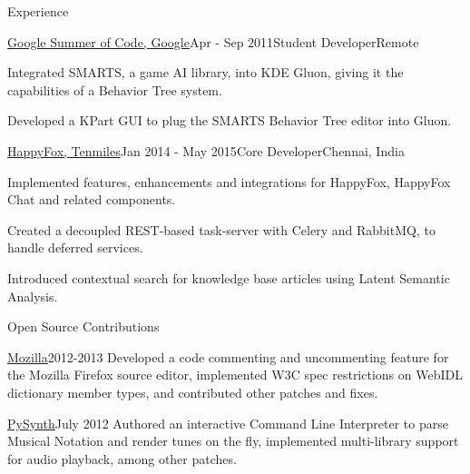 \documentclass{resume} %
\begin{document}
\begin{rSection}{Experience}
\vspace{2mm}

    \begin{rSubsection}{\href{https://www.google-melange.com/gsoc/project/details/google/gsoc2011/pranavrc/5757334940811264}{Google Summer of Code, Google}}{Apr - Sep 2011}{Student Developer}{Remote}
\item Integrated SMARTS, a game AI library, into KDE Gluon, giving it the capabilities of a Behavior Tree system.
\item Developed a KPart GUI to plug the SMARTS Behavior Tree editor into Gluon.
\end{rSubsection}


\begin{rSubsection}{\href{https://happyfox.com/}{HappyFox, Tenmiles}}{Jan 2014 - May 2015}{Core Developer}{Chennai, India}
\item Implemented features, enhancements and integrations for HappyFox, HappyFox Chat and related components.
\item Created a decoupled REST-based task-server with Celery and RabbitMQ, to handle deferred services.
\item Introduced contextual search for knowledge base articles using Latent Semantic Analysis.
\end{rSubsection}


\end{rSection}


\begin{rSection}{Open Source Contributions}
\vspace{2mm}

\begin{rSubsection}{\href{https://bugzilla.mozilla.org/user\%5Fprofile?user\%5Fid=431664}{Mozilla}}{2012-2013}{}{}
Developed a code commenting and uncommenting feature for the Mozilla Firefox source editor, implemented W3C spec restrictions on WebIDL dictionary member types, and contributed other patches and fixes.
\end{rSubsection}

\begin{rSubsection}{\href{https://github.com/mdoege/PySynth/commits?author=pranavrc}{PySynth}}{July 2012}{}{}
Authored an interactive Command Line Interpreter to parse Musical Notation and render tunes on the fly, implemented multi-library support for audio playback, among other patches.
\end{rSubsection}

\end{rSection}
\end{document}
